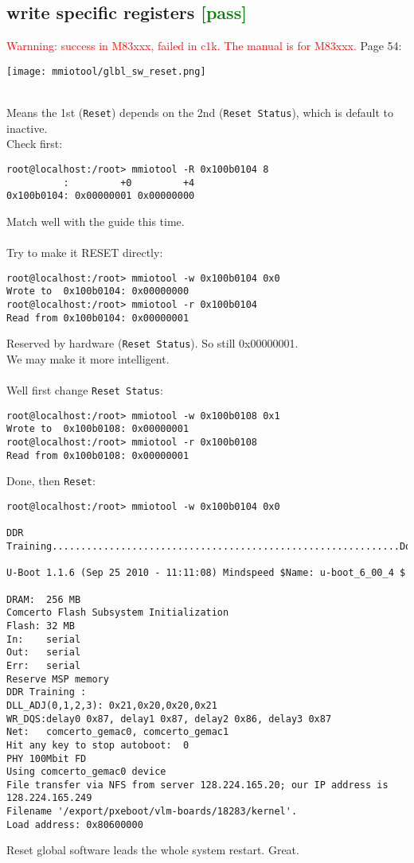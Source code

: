\documentclass[a4paper]{report}
\begin{document}
\subsection{write specific registers \textcolor{green}{[pass]}}
\textcolor{red}{Warnning: success in M83xxx, failed in c1k. The manual is for M83xxx.}
Page 54:
\\[\intextsep]
\begin{minipage}{\textwidth}
\centering
\texttt{[image: mmiotool/glbl\_sw\_reset.png]}
\end{minipage}
\\[\intextsep]
Means the 1st ({\tt Reset}) depends on the 2nd ({\tt Reset Status}), which is default 
to inactive.\\
Check first:
\begin{lstlisting}
root@localhost:/root> mmiotool -R 0x100b0104 8
          :         +0         +4
0x100b0104: 0x00000001 0x00000000
\end{lstlisting}
Match well with the guide this time.\\\\
Try to make it RESET directly:
\begin{lstlisting}
root@localhost:/root> mmiotool -w 0x100b0104 0x0
Wrote to  0x100b0104: 0x00000000
root@localhost:/root> mmiotool -r 0x100b0104
Read from 0x100b0104: 0x00000001
\end{lstlisting}
Reserved by hardware ({\tt Reset Status}). So still 0x00000001.\\
We may make it more intelligent.\\\\
Well first change {\tt Reset Status}:
\begin{lstlisting}
root@localhost:/root> mmiotool -w 0x100b0108 0x1
Wrote to  0x100b0108: 0x00000001
root@localhost:/root> mmiotool -r 0x100b0108
Read from 0x100b0108: 0x00000001
\end{lstlisting}
Done, then {\tt Reset}:
\begin{lstlisting}
root@localhost:/root> mmiotool -w 0x100b0104 0x0

DDR Training.............................................................Done

U-Boot 1.1.6 (Sep 25 2010 - 11:11:08) Mindspeed $Name: u-boot_6_00_4 $

DRAM:  256 MB
Comcerto Flash Subsystem Initialization
Flash: 32 MB
In:    serial
Out:   serial
Err:   serial
Reserve MSP memory
DDR Training : 
DLL_ADJ(0,1,2,3): 0x21,0x20,0x20,0x21
WR_DQS:delay0 0x87, delay1 0x87, delay2 0x86, delay3 0x87
Net:   comcerto_gemac0, comcerto_gemac1
Hit any key to stop autoboot:  0 
PHY 100Mbit FD
Using comcerto_gemac0 device
File transfer via NFS from server 128.224.165.20; our IP address is 128.224.165.249
Filename '/export/pxeboot/vlm-boards/18283/kernel'.
Load address: 0x80600000
\end{lstlisting}
Reset global software leads the whole system restart. Great.
\end{document}

